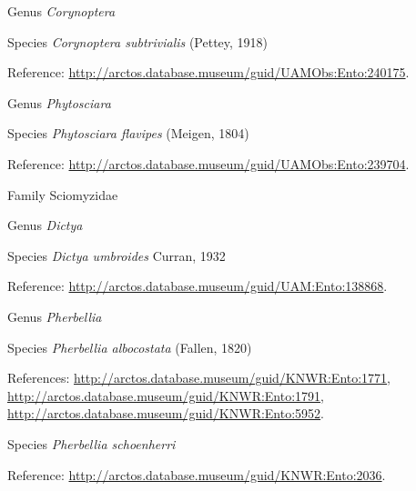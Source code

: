 \documentclass[9pt, article]{memoir}
\begin{document}
\begin{multicols}{2}
\vspace{6pt}\noindent\hspace{30pt}Genus \textit{Corynoptera}


\vspace{6pt}\noindent\hspace{36pt}Species \textit{Corynoptera subtrivialis} (Pettey, 1918)


Reference: 
\url{http://arctos.database.museum/guid/UAMObs:Ento:240175}.

\vspace{6pt}\noindent\hspace{30pt}Genus \textit{Phytosciara}


\vspace{6pt}\noindent\hspace{36pt}Species \textit{Phytosciara flavipes} (Meigen, 1804)


Reference: 
\url{http://arctos.database.museum/guid/UAMObs:Ento:239704}.

\vspace{6pt}\noindent\hspace{24pt}Family Sciomyzidae


\vspace{6pt}\noindent\hspace{30pt}Genus \textit{Dictya}


\vspace{6pt}\noindent\hspace{36pt}Species \textit{Dictya umbroides} Curran, 1932


Reference: 
\url{http://arctos.database.museum/guid/UAM:Ento:138868}.

\vspace{6pt}\noindent\hspace{30pt}Genus \textit{Pherbellia}


\vspace{6pt}\noindent\hspace{36pt}Species \textit{Pherbellia albocostata} (Fallen, 1820)


References: 
\url{http://arctos.database.museum/guid/KNWR:Ento:1771}, 
\url{http://arctos.database.museum/guid/KNWR:Ento:1791}, 
\url{http://arctos.database.museum/guid/KNWR:Ento:5952}.

\vspace{6pt}\noindent\hspace{36pt}Species \textit{Pherbellia schoenherri}


Reference: 
\url{http://arctos.database.museum/guid/KNWR:Ento:2036}.


\end{multicols}
\end{document}
